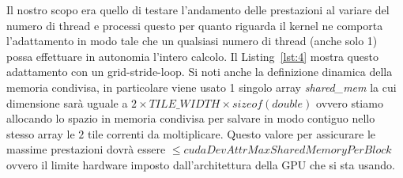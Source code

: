 \documentclass[a4paper]{article}
\begin{document}
Il nostro scopo era quello di testare l'andamento delle prestazioni al variare del numero di thread e processi questo per quanto riguarda il kernel ne comporta l'adattamento in modo tale che un qualsiasi numero di thread (anche solo 1) possa effettuare in autonomia l'intero calcolo. Il Listing~\ref{lst:4} mostra questo adattamento con un grid-stride-loop. Si noti anche la definizione dinamica della memoria condivisa, in particolare viene usato 1 singolo array \textit{shared\_mem} la cui dimensione sarà uguale a $2\times{TILE\_WIDTH}\times{sizeof(double)}$ ovvero stiamo allocando lo spazio in memoria condivisa per salvare in modo contiguo nello stesso array le $2$ tile correnti da moltiplicare. Questo valore per assicurare le massime prestazioni dovrà essere $\leq cudaDevAttrMaxSharedMemoryPerBlock$ ovvero il limite hardware imposto dall'architettura della GPU che si sta usando.
\end{document}
